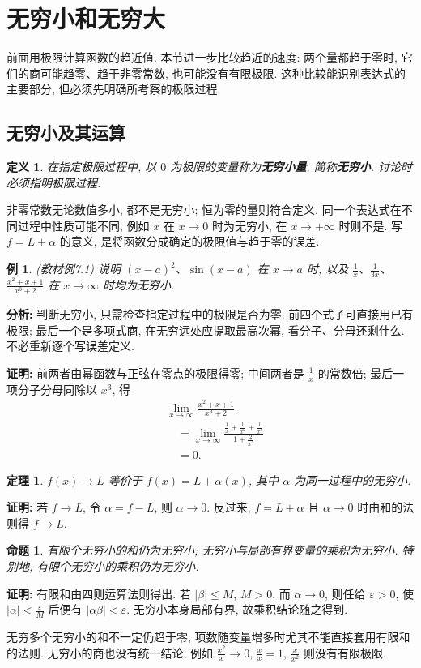 \documentclass[UTF8,openany]{ctexbook}
\theoremstyle{chinesetextbook}
\newtheorem{definition}{定义}[section]
\newtheorem{example}{例}[section]
\newtheorem{proposition}{命题}[section]
\newenvironment{cnproof}{\par\indent\textbf{证明:} \ignorespaces}{\par}
\newtheorem*{theoremsingle}{定理}
\begin{document}
\section{无穷小和无穷大}
前面用极限计算函数的趋近值. 本节进一步比较趋近的速度: 两个量都趋于零时, 它们的商可能趋零、趋于非零常数, 也可能没有有限极限. 这种比较能识别表达式的主要部分, 但必须先明确所考察的极限过程.
\subsection{无穷小及其运算}
\begin{definition}
在指定极限过程中, 以 $0$ 为极限的变量称为\textbf{无穷小量}, 简称\textbf{无穷小}. 讨论时必须指明极限过程.
\end{definition}
非零常数无论数值多小, 都不是无穷小; 恒为零的量则符合定义. 同一个表达式在不同过程中性质可能不同, 例如 $x$ 在 $x\to0$ 时为无穷小, 在 $x\to+\infty$ 时则不是. 写 $f=L+\alpha$ 的意义, 是将函数分成确定的极限值与趋于零的误差.
\begin{example}
(教材例7.1) 说明 $(x-a)^2$、$\sin(x-a)$ 在 $x\to a$ 时, 以及 $\displaystyle \frac1x$、$\displaystyle \frac1{3x}$、$\displaystyle \frac{x^2+x+1}{x^3+2}$ 在 $x\to\infty$ 时均为无穷小.
\end{example}
\par\indent\textbf{分析:} 判断无穷小, 只需检查指定过程中的极限是否为零. 前四个式子可直接用已有极限; 最后一个是多项式商, 在无穷远处应提取最高次幂, 看分子、分母还剩什么. 不必重新逐个写误差定义.
\begin{cnproof}
前两者由幂函数与正弦在零点的极限得零; 中间两者是 $\displaystyle \frac1x$ 的常数倍; 最后一项分子分母同除以 $x^3$, 得
\[
\begin{aligned}
&\lim_{x\to\infty}\frac{x^2+x+1}{x^3+2}\\
&\quad=\lim_{x\to\infty}\frac{\frac1x+\frac1{x^2}+\frac1{x^3}}{1+\frac2{x^3}}\\
&\quad=0.
\end{aligned}
\]
\end{cnproof}
\begin{theoremsingle}
$f(x)\to L$ 等价于 $f(x)=L+\alpha(x)$, 其中 $\alpha$ 为同一过程中的无穷小.
\end{theoremsingle}
\begin{cnproof}
若 $f\to L$, 令 $\alpha=f-L$, 则 $\alpha\to0$. 反过来, $f=L+\alpha$ 且 $\alpha\to0$ 时由和的法则得 $f\to L$.
\end{cnproof}
\begin{proposition}
有限个无穷小的和仍为无穷小; 无穷小与局部有界变量的乘积为无穷小. 特别地, 有限个无穷小的乘积仍为无穷小.
\end{proposition}
\begin{cnproof}
有限和由四则运算法则得出. 若 $|\beta|\le M$, $M>0$, 而 $\alpha\to0$, 则任给 $\varepsilon>0$, 使 $\displaystyle |\alpha|<\frac\varepsilon M$ 后便有 $|\alpha\beta|<\varepsilon$. 无穷小本身局部有界, 故乘积结论随之得到.
\end{cnproof}
无穷多个无穷小的和不一定仍趋于零, 项数随变量增多时尤其不能直接套用有限和的法则. 无穷小的商也没有统一结论, 例如 $\displaystyle \frac{x^2}{x}\to0$, $\displaystyle \frac xx=1$, $\displaystyle \frac x{x^2}$ 则没有有限极限.
\end{document}
